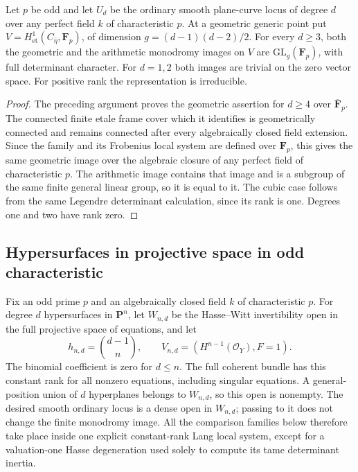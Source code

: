 \begin{theorem}\label{thm:plane-odd-all-groups}
Let $p$ be odd and let $U_d$ be the ordinary smooth plane-curve locus
of degree $d$ over any perfect field $k$ of characteristic $p$.  At a
geometric generic point put
$V=H^1_{\mathrm{et}}(C_{\bar\eta},\mathbf F_p)$, of dimension
$g=(d-1)(d-2)/2$.  For every $d\geq3$, both the geometric and the
arithmetic monodromy images on $V$ are
$\mathrm{GL}_g(\mathbf F_p)$, with full determinant character.
For $d=1,2$ both images are trivial on the zero vector space.
For positive rank the representation is irreducible.
\end{theorem}

\begin{proof}
The preceding argument proves the geometric assertion for $d\geq4$
over $\overline{\mathbf F}_p$.  The connected finite etale frame cover
which it identifies is geometrically connected and remains connected
after every algebraically closed field extension.  Since the family
and its Frobenius local system are defined over $\mathbf F_p$, this
gives the same geometric image over the algebraic closure of any
perfect field of characteristic $p$.
The arithmetic image contains that image and is a subgroup of the
same finite general linear group, so it is equal to it.  The cubic
case follows from the same Legendre determinant calculation, since
its rank is one.  Degrees one and two have rank zero.
\end{proof}

\subsection{Hypersurfaces in projective space in odd characteristic}
\label{subsec:projective-space-odd-monodromy}

Fix an odd prime $p$ and an algebraically closed field $k$ of
characteristic $p$.  For degree $d$ hypersurfaces in $\mathbf P^n$,
let $W_{n,d}$ be the Hasse--Witt invertibility open in the full
projective space of equations, and let
\[
 h_{n,d}=\binom{d-1}{n},\qquad
 V_{n,d}=\left(H^{n-1}(\mathcal O_Y),F=1\right).
\]
The binomial coefficient is zero for $d\leq n$.
The full coherent bundle has this constant rank for all nonzero
equations, including singular equations.  A general-position union
of $d$ hyperplanes belongs to $W_{n,d}$, so this open is nonempty.
The desired smooth ordinary locus is a dense open in $W_{n,d}$;
passing to it does not change the finite monodromy image.
All the comparison families below therefore take place inside
one explicit constant-rank Lang local system, except for a
valuation-one Hasse degeneration used solely to compute its tame
determinant inertia.

